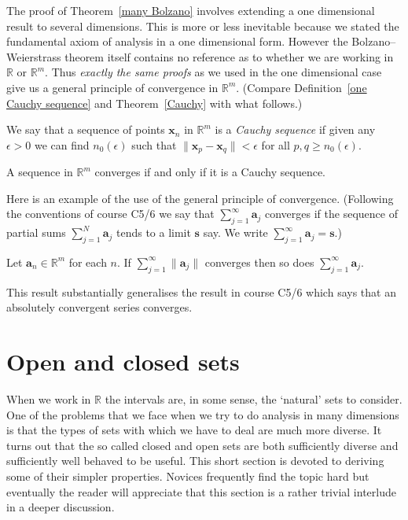 The proof of Theorem~\ref{many Bolzano} involves
extending a one dimensional result to several dimensions.
This is more or less inevitable because we stated the
fundamental axiom of analysis in a one dimensional form.
However the Bolzano--Weierstrass theorem itself 
contains no reference as to whether we are working in ${\mathbb R}$
or ${\mathbb R}^{m}$.  Thus \emph{exactly the same proofs}
as we used in the one dimensional case
give us a general principle of convergence in ${\mathbb R}^{m}$.
(Compare Definition~\ref{one Cauchy sequence} and
Theorem~\ref{Cauchy} with what follows.)
\begin{definition} We say that a sequence of points
$\mathbf{x}_{n}$ in ${\mathbb R}^{m}$ is a \emph{Cauchy sequence} 
if given any
$\epsilon>0$ we can find $n_{0}(\epsilon)$ such that
$\|\mathbf{x}_{p}-\mathbf{x}_{q}\|<\epsilon$ 
for all $p,q\geq n_{0}(\epsilon)$.
\end{definition}
\begin{theorem}\label{many Cauchy}
A sequence in ${\mathbb R}^{m}$ converges if and only if
it is a Cauchy sequence.
\end{theorem}

Here is an example of the use of the general principle of convergence.
(Following the conventions of course C5/6 we say that 
$\sum_{j=1}^{\infty}\mathbf{a}_{j}$ converges if
the sequence of partial sums
$\sum_{j=1}^{N}\mathbf{a}_{j}$ tends to a limit  ${\mathbf s}$
say. We write $\sum_{j=1}^{\infty}\mathbf{a}_{j}={\mathbf s}$.)
\begin{theorem} Let $\mathbf{a}_{n}\in{\mathbb R}^{m}$ for each $n$.
If $\sum_{j=1}^{\infty}\|\mathbf{a}_{j}\|$ converges then so does
$\sum_{j=1}^{\infty}\mathbf{a}_{j}$.
\end{theorem}
This result substantially generalises the result in course C5/6
which says that an absolutely convergent series converges.
\section{Open and closed sets}\label{open and closed}
When we work in ${\mathbb R}$
the intervals are, in some sense, the `natural' sets
to consider. One of the problems that we face when we
try to do analysis in many dimensions is that the
types of sets with which we have to deal are much more
diverse. It turns out that the so called closed
and open sets are both sufficiently diverse
and sufficiently well behaved to be useful.
This short section is devoted to deriving some of their
simpler properties. Novices frequently find the
topic hard but eventually the reader will appreciate
that this section is a rather trivial interlude
in a deeper discussion.

